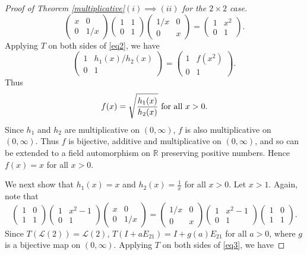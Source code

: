 \documentclass[11pt,reqno]{amsart}
\theoremstyle{plain}
\newcommand{\IR}{\mathbb{R}}
\theoremstyle{definition}
\numberwithin{equation}{section}
\def\cL{\mathcal L}
\begin{document}
\begin{proof}[Proof of Theorem \ref{multiplicative}$(i)\implies (ii)$ for the $2\times2$ case]
	\begin{equation}\label{eq2}
		\begin{pmatrix}
			x & 0 \\ 0 & 1/x
		\end{pmatrix} \begin{pmatrix}
			1 & 1 \\ 0 & 1
		\end{pmatrix}\begin{pmatrix}
			1/x & 0 \\ 0 & x
		\end{pmatrix}= \begin{pmatrix}
			1 & x^2 \\ 0 & 1
		\end{pmatrix}.
	\end{equation}
Applying $T$ on both sides of \eqref{eq2}, we have 
	\[\begin{pmatrix}
		1 & h_1(x)/h_2(x) \\ 0 & 1
	\end{pmatrix}=\begin{pmatrix}
		1 & f(x^2) \\ 0 & 1
	\end{pmatrix}.\]
	Thus 
	\begin{equation}\label{eqnf}
		f(x)=\sqrt{\frac{h_1(x)}{h_2(x)}} \hbox{  for all  } x>0.
	\end{equation}Since $h_1$ and $h_2$ are multiplicative on $(0,\infty)$, $f$ is also multiplicative on $(0,\infty)$.  Thus $f$ is bijective, additive and multiplicative on $(0,\infty)$, and so can be extended to  a field automorphism on $\IR$ preserving positive numbers. Hence $f(x) = x$ for all $x > 0$.
	
We next show that $h_1(x)=x$ and $h_2(x)=\frac{1}{x}$ for all $x>0$. Let $x>1$.  Again, note that 
	\begin{equation}\label{eq3}
		\begin{pmatrix}
			1 & 0 \\ 1 & 1
		\end{pmatrix} \begin{pmatrix}
			1 & x^2-1 \\ 0 & 1
		\end{pmatrix}\begin{pmatrix}
			x & 0 \\ 0 & 1/x
		\end{pmatrix}= 
		\begin{pmatrix}
			1/x & 0 \\ 0 & x
		\end{pmatrix} \begin{pmatrix}
			1 & x^2-1 \\ 0 & 1
		\end{pmatrix}\begin{pmatrix}
			1 & 0 \\ 1 & 1
		\end{pmatrix}.
	\end{equation}
	Since $ T(\cL(2)) = \cL(2)$, $ T(I + aE_{21}) = I + g(a)E_{21}$ for all $a >0$, where $g$ is a bijective map on $(0,\infty)$.  Applying $T$ on both sides of \eqref{eq3}, we have 
	

\end{proof}
\end{document}
